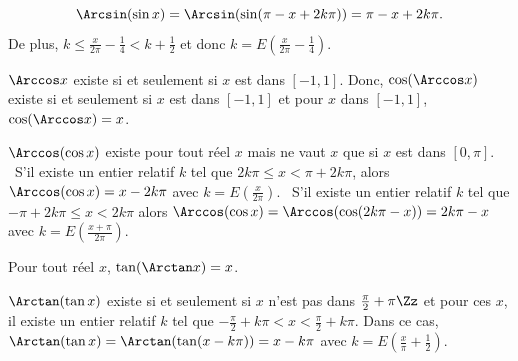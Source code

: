 {\begin{enumerate}
{$$\Arcsin(\sin x)=\Arcsin(\sin(\pi-x+2k\pi))=\pi-x+2k\pi.$$
De plus, $k\leq\frac{x}{2\pi}-\frac{1}{4}<k+\frac{1}{2}$ et donc $k=E\left(\frac{x}{2\pi}-\frac{1}{4}\right)$.
 \item  $\Arccos x$ existe si et seulement si $x$ est dans $[-1,1]$. Donc, $\cos(\Arccos x)$ existe si et seulement si
$x$ est dans $[-1,1]$ et pour $x$ dans $[-1,1]$, $\cos(\Arccos x)=x$.
 \item  $\Arccos(\cos x)$ existe pour tout réel $x$ mais ne vaut $x$ que si $x$ est dans $[0,\pi]$.
\textbullet~S'il existe un
entier relatif $k$ tel que $2k\pi\leq x<\pi+2k\pi$, alors $\Arccos(\cos x)=x-2k\pi$ avec $k=E\left(\frac{x}{2\pi}\right)$.
\textbullet~S'il existe un entier relatif $k$ tel que $-\pi+2k\pi\leq x<2k\pi$ alors 
$\Arccos(\cos x)=\Arccos(\cos(2k\pi-x))=2k\pi-x$ avec $k=E\left(\frac{x+\pi}{2\pi}\right)$.
 \item  Pour tout réel $x$, $\tan(\Arctan x)=x$.
 \item  $\Arctan(\tan x)$ existe si et seulement si $x$ n'est pas
dans $\frac{\pi}{2}+\pi\Zz$ et pour ces $x$, il existe un entier relatif $k$ 
tel que $-\frac{\pi}{2}+k\pi<x<\frac{\pi}{2}+k\pi$. Dans ce cas, $\Arctan(\tan x)=\Arctan(\tan(x-k\pi))=x-k\pi$ avec
$k=E\left(\frac{x}{\pi}+\frac{1}{2}\right)$.
}
\end{enumerate}
}

